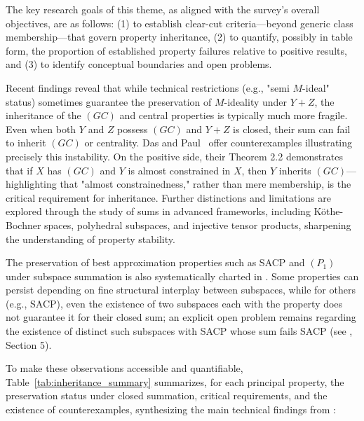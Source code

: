 \documentclass[sigconf]{acmart}
\begin{document}
The key research goals of this theme, as aligned with the survey's overall objectives, are as follows: (1) to establish clear-cut criteria—beyond generic class membership—that govern property inheritance, (2) to quantify, possibly in table form, the proportion of established property failures relative to positive results, and (3) to identify conceptual boundaries and open problems.

Recent findings reveal that while technical restrictions (e.g., "semi $M$-ideal" status) sometimes guarantee the preservation of $M$-ideality under $Y+Z$, the inheritance of the $(GC)$ and central properties is typically much more fragile. Even when both $Y$ and $Z$ possess $(GC)$ and $Y+Z$ is closed, their sum can fail to inherit $(GC)$ or centrality. Das and Paul~\cite{ref103} offer counterexamples illustrating precisely this instability. On the positive side, their Theorem 2.2 demonstrates that if $X$ has $(GC)$ and $Y$ is almost constrained in $X$, then $Y$ inherits $(GC)$—highlighting that "almost constrainedness," rather than mere membership, is the critical requirement for inheritance. Further distinctions and limitations are explored through the study of sums in advanced frameworks, including Köthe-Bochner spaces, polyhedral subspaces, and injective tensor products, sharpening the understanding of property stability.

The preservation of best approximation properties such as SACP and $(P_1)$ under subspace summation is also systematically charted in \cite{ref103}. Some properties can persist depending on fine structural interplay between subspaces, while for others (e.g., SACP), even the existence of two subspaces each with the property does not guarantee it for their closed sum; an explicit open problem remains regarding the existence of distinct such subspaces with SACP whose sum fails SACP (see \cite{ref103}, Section 5).

To make these observations accessible and quantifiable, Table~\ref{tab:inheritance_summary} summarizes, for each principal property, the preservation status under closed summation, critical requirements, and the existence of counterexamples, synthesizing the main technical findings from \cite{ref103}:
\end{document}

